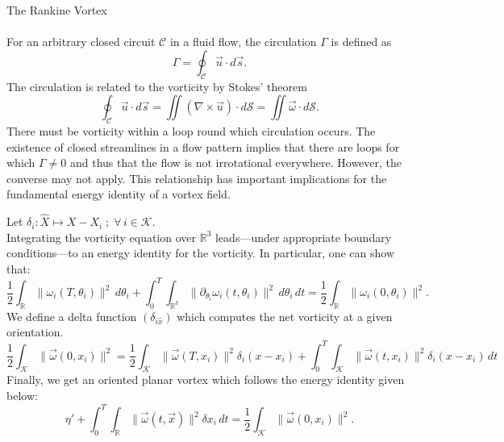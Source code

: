 \documentclass[12pt]{article}
\begin{document}
\begin{remark} The Rankine Vortex \\ \\ 
    For an arbitrary closed circuit \( \mathcal{C} \) in a fluid flow, the circulation \( \Gamma \) is defined as
    \[
    \Gamma = \oint_{\mathcal{C}} \vec{u} \cdot d\vec{s}.
    \]
    The circulation is related to the vorticity by Stokes' theorem
    \[
    \oint_{\mathcal{C}} \vec{u} \cdot d\vec{s} = \iint (\nabla \times \vec{u}) \cdot d\mathcal{S} = \iint \vec{\omega} \cdot d\mathcal{S}.
    \]
    There must be vorticity within a loop round which circulation occurs. The existence of closed streamlines in a flow pattern implies that there are loops for which \( \Gamma \neq 0 \) and thus that the flow is not irrotational everywhere. However, the converse may not apply. This relationship has important implications for the fundamental energy identity of a vortex field.

    \begin{corollary} Let $\delta_{i} : \hat X \mapsto X - X_{i} \;;\; \forall \, i \in \mathcal{K}$. \\
    Integrating the vorticity equation over $\mathbb{R}^3$  leads—under appropriate boundary conditions—to an energy identity for the vorticity. In particular, one can show that:
    \[
    \frac{1}{2} \int_{\mathbb{R}} \|{\omega}_{i}(T, \theta_{i})\|^{2}\,d \theta_{i} + \int_{0}^{T} \int_{\mathbb{R}^{3}} \|\partial_{\theta_{i}}{\omega}_{i}(t,\theta_{i})\|^{2}\,d\theta_{i}\,dt = \frac{1}{2} \int_{\mathbb{R}} \|{\omega}_{i}(0,\theta_{i})\|^{2} . 
    \] 
    We define a delta function $(\delta_{i \hat x})$ which computes the net vorticity at a given orientation. 
    \[
     \frac{1}{2} \int_{\mathcal{K}} \|\vec \omega (0, x_{i})\|^{2} = \frac{1}{2} \int_{\mathcal{K}} \|\vec \omega (T, x_{i})\|^{2} \delta_{i} (x - x_{i}) + \int_{0}^{T} \int_{\mathcal{K}} \|\vec \omega (t, x_{i})\|^{2} \delta_{i} (x - x_{i}) \, dt 
    \]
    Finally, we get an oriented planar vortex which follows the energy identity given below: 
    \[
    \eta' + \int_{0}^{T} \int_{\mathbb{R}} \|\vec \omega (t, \vec x)\|^{2} \delta x_{i} \, dt = \frac{1}{2} \int_{\mathcal{K}} \|\vec \omega (0, x_{i})\|^{2}. 
    \]
    \end{corollary}     


\end{remark}
\end{document}

